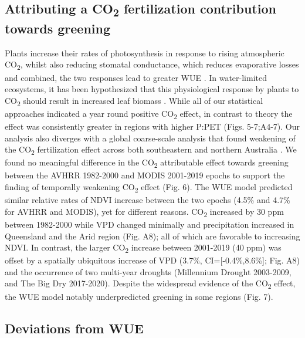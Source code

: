 \documentclass[gc, manuscript]{copernicus}
\begin{document}
\subsection{\texorpdfstring{Attributing a CO\textsubscript{2}
fertilization contribution towards
greening}{Attributing a CO2 fertilization contribution towards greening}}

Plants increase their rates of photosynthesis in response to rising
atmospheric CO\textsubscript{2}, whilst also reducing stomatal
conductance, which reduces evaporative losses and combined, the two
responses lead to greater WUE
\citep{ainsworthResponsePhotosynthesisStomatal2007, morisonSensitivityStomataWater1985}.
In water-limited ecosystems, it has been hypothesized that this
physiological response by plants to CO\textsubscript{2} should result in
increased leaf biomass
\citep{donohueImpactCOFertilization2013b, ukkolaReducedStreamflowWaterstressed2016b}.
While all of our statistical approaches indicated a year round positive
CO\textsubscript{2} effect, in contrast to theory the effect was
consistently greater in regions with higher P:PET (Figs. 5-7;A4-7). Our
analysis also diverges with a global coarse-scale analysis that found
weakening of the CO\textsubscript{2} fertilization effect across both
southeastern and northern Australia \citep{wangRecentGlobalDecline2020}.
We found no meaningful difference in the CO\textsubscript{2}
attributable effect towards greening between the AVHRR 1982-2000 and
MODIS 2001-2019 epochs to support the finding of temporally weakening
CO\textsubscript{2} effect (Fig. 6). The WUE model predicted similar
relative rates of NDVI increase between the two epochs (4.5\% and 4.7\%
for AVHRR and MODIS), yet for different reasons. CO\textsubscript{2}
increased by 30 ppm between 1982-2000 while VPD changed minimally and
precipitation increased in Queensland and the Arid region (Fig. A8); all
of which are favorable to increasing NDVI. In contrast, the larger
CO\textsubscript{2} increase between 2001-2019 (40 ppm) was offset by a
spatially ubiquitous increase of VPD (3.7\%, CI={[}-0.4\%,8.6\%{]}; Fig.
A8) and the occurrence of two multi-year droughts (Millennium Drought
2003-2009, and The Big Dry 2017-2020). Despite the widespread evidence
of the CO\textsubscript{2} effect, the WUE model notably underpredicted
greening in some regions (Fig. 7).

\subsection{Deviations from WUE}
\end{document}
